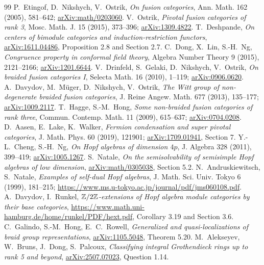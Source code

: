 \documentclass[11pt,a4paper]{article}
\theoremstyle{remark}\newtheorem{remark}[theorem]{Remark}
\begin{document}
\begin{thebibliography}{99}
 P.~Etingof, D.~Nikshych, V.~Ostrik, \emph{On fusion categories}, Ann. Math. 162 (2005), 581--642; \href{https://arxiv.org/abs/math/0203060}{arXiv:math/0203060}.
 V.~Ostrik, \emph{Pivotal fusion categories of rank 3}, Mosc. Math. J. 15 (2015), 373--396; \href{https://arxiv.org/abs/1309.4822}{arXiv:1309.4822}.
 T.~Deshpande, \emph{On centers of bimodule categories and induction-restriction functors}, \href{https://arxiv.org/abs/1611.04486}{arXiv:1611.04486}, Proposition 2.8 and Section 2.7.
 C.~Dong, X.~Lin, S.-H.~Ng, \emph{Congruence property in conformal field theory}, Algebra Number Theory 9 (2015), 2121--2166; \href{https://arxiv.org/abs/1201.6644}{arXiv:1201.6644}.
 V.~Drinfeld, S.~Gelaki, D.~Nikshych, V.~Ostrik, \emph{On braided fusion categories I}, Selecta Math. 16 (2010), 1--119; \href{https://arxiv.org/abs/0906.0620}{arXiv:0906.0620}.
 A.~Davydov, M.~M\"uger, D.~Nikshych, V.~Ostrik, \emph{The Witt group of non-degenerate braided fusion categories}, J. Reine Angew. Math. 677 (2013), 135--177; \href{https://arxiv.org/abs/1009.2117}{arXiv:1009.2117}.
 T.~Hagge, S.-M.~Hong, \emph{Some non-braided fusion categories of rank three}, Commun. Contemp. Math. 11 (2009), 615--637; \href{https://arxiv.org/abs/0704.0208}{arXiv:0704.0208}.
 D.~Aasen, E.~Lake, K.~Walker, \emph{Fermion condensation and super pivotal categories}, J. Math. Phys. 60 (2019), 121901; \href{https://arxiv.org/abs/1709.01941}{arXiv:1709.01941}, Section 7.
 Y.-L.~Cheng, S.-H.~Ng, \emph{On Hopf algebras of dimension $4p$}, J. Algebra 328 (2011), 399--419; \href{https://arxiv.org/abs/1005.1267}{arXiv:1005.1267}.
 S.~Natale, \emph{On the semisolvability of semisimple Hopf algebras of low dimension}, \href{https://arxiv.org/abs/math/0305038}{arXiv:math/0305038}, Section 5.2.
 N.~Andruskiewitsch, S.~Natale, \emph{Examples of self-dual Hopf algebras}, J. Math. Sci. Univ. Tokyo 6 (1999), 181--215; \url{https://www.ms.u-tokyo.ac.jp/journal/pdf/jms060108.pdf}.
 A.~Davydov, I.~Runkel, \emph{$\mathbb Z/2\mathbb Z$-extensions of Hopf algebra module categories by their base categories}, \url{https://www.math.uni-hamburg.de/home/runkel/PDF/hext.pdf}, Corollary 3.19 and Section 3.6.
 C.~Galindo, S.-M.~Hong, E.~C.~Rowell, \emph{Generalized and quasi-localizations of braid group representations}, \href{https://arxiv.org/abs/1105.5048}{arXiv:1105.5048}, Theorem 5.20.
 M.~Alekseyev, W.~Bruns, J.~Dong, S.~Palcoux, \emph{Classifying integral Grothendieck rings up to rank 5 and beyond}, \href{https://arxiv.org/abs/2507.07023}{arXiv:2507.07023}, Question 1.14.

\end{thebibliography}
\end{document}
